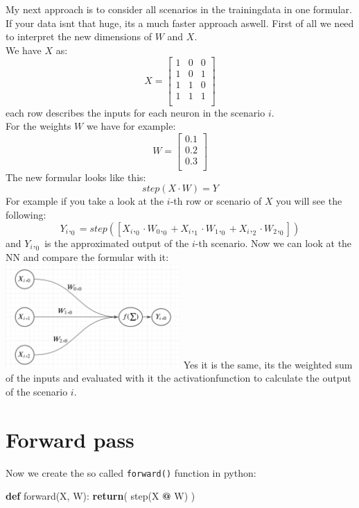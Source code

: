 \documentclass[
]{book}
\newenvironment{Shaded}{\begin{snugshade}}{\end{snugshade}}
\newcommand{\ControlFlowTok}[1]{\textcolor[rgb]{0.13,0.29,0.53}{\textbf{#1}}}
\newcommand{\KeywordTok}[1]{\textcolor[rgb]{0.13,0.29,0.53}{\textbf{#1}}}
\newcommand{\NormalTok}[1]{#1}
\newcommand{\OperatorTok}[1]{\textcolor[rgb]{0.81,0.36,0.00}{\textbf{#1}}}
\begin{document}
My next approach is to consider all scenarios in the trainingdata in one formular. If your data isnt that huge, its a much faster approach aswell. First of all we need to interpret the new dimensions of \(W\) and \(X\).\\
We have \(X\) as:
\[
  X = \left[
  \begin{array}{ccc}
  1 & 0 & 0 \\
  1 & 0 & 1 \\
  1 & 1 & 0 \\
  1 & 1 & 1 \\
  \end{array}
  \right]
\]
each row describes the inputs for each neuron in the scenario \(i\).\\
For the weights \(W\) we have for example:
\[
  W =\left[
  \begin{array}{c}
  0.1 \\ 
  0.2 \\ 
  0.3 \\
  \end{array}
  \right]
\]
The new formular looks like this:
\[
  step(X \cdot W) = Y
\]
For example if you take a look at the \(i\)-th row or scenario of \(X\) you will see the following:
\[
  Y_i,_0 = step([X_i,_0 \cdot W_0,_0 + X_i,_1 \cdot W_1,_0 + X_i,_2 \cdot W_2,_0])
\]
and \(Y_i,_0\) is the approximated output of the \(i\)-th scenario. Now we can look at the NN and compare the formular with it:\\
\includegraphics[width=0.5\textwidth,height=\textheight]{./img/NN_01_v2.png}
Yes it is the same, its the weighted sum of the inputs and evaluated with it the activationfunction to calculate the output of the scenario \(i\).

\hypertarget{forward-pass}{%
\section{Forward pass}\label{forward-pass}}

Now we create the so called \texttt{forward()} function in python:

\begin{Shaded}
\begin{Highlighting}[]
\KeywordTok{def}\NormalTok{ forward(X, W):}
  \ControlFlowTok{return}\NormalTok{( step(X }\OperatorTok{@}\NormalTok{ W) )}
\end{Highlighting}
\end{Shaded}
\end{document}
